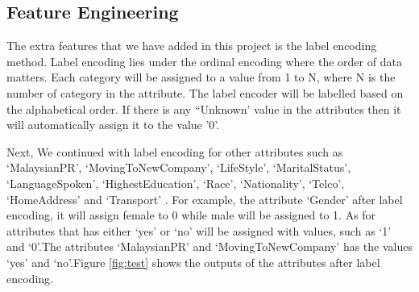 \documentclass[11pt]{article}
\begin{document}
\hspace{0.5cm}{Besides that, if the unique value frequency of the variable does not make a huge differences, then we replace the NaN values to ``Unknown". As for the attributes like ``Nationality', ``MaritalStatus', and ``Race' we have replaced the NaN value to "Unknown".} 

 
\subsection{Feature Engineering}

\hspace{0.5cm}The extra features that we have added in this project is the label encoding method. Label encoding lies under the ordinal encoding where the order of data matters. Each category will be assigned to a value from 1 to N, where N is the number of category in the attribute. The label encoder will be labelled based on the alphabetical order. If there is any ``Unknown' value in the attributes then it will automatically assign it to the value '0'.\vspace{0.3cm}

\hspace{0.5cm}Next, We continued with label encoding for other attributes such as `MalaysianPR', `MovingToNewCompany', `LifeStyle', `MaritalStatus', `LanguageSpoken', `HighestEducation', `Race', `Nationality', `Telco', `HomeAddress' and `Transport' . For example, the attribute `Gender' after label encoding, it will assign female to 0 while male will be assigned to 1. As for attributes that has either `yes' or `no' will be assigned with values, such as `1' and `0'.The attributes `MalaysianPR' and `MovingToNewCompany' has the values `yes' and `no'.Figure \ref{fig:test} shows the outputs of the attributes after label encoding.
\end{document}
